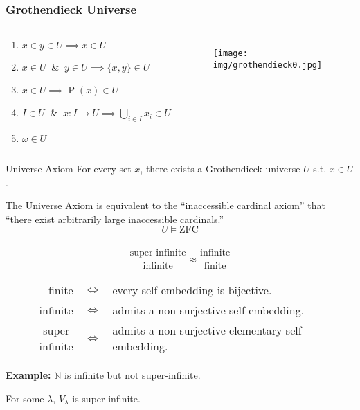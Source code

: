 \documentclass[UTF8,11pt,colorlinks,compress,openany]{beamer}%
\begin{document}
\begin{frame}\frametitle{Grothendieck Universe}
\begin{columns}
\begin{definition}
\begin{enumerate}
\item $x\in y\in U\implies x\in U$
\item $x\in U\;\; \&\;\; y\in U\implies \{x,y\}\in U$
\item $x\in U\implies \operatorname{P}(x)\in U$
\item $I\in U\;\; \&\;\; x: I\to U\implies\bigcup\limits_{i\in I}x_i\in U$
\item $\omega\in U$
\end{enumerate}
\end{definition}
\begin{figure}
\texttt{[image: img/grothendieck0.jpg]}
\end{figure}
\end{columns}
\begin{block}{Universe Axiom}
For every set $x$, there exists a Grothendieck universe $U$ s.t. $x\in U$.
\end{block}
\begin{center}
\end{center}
The Universe Axiom is equivalent to the ``inaccessible cardinal axiom'' that ``there exist arbitrarily large inaccessible cardinals.''
\[U\vDash\mathrm{ZFC}\]
\end{frame}

\begin{frame}\frametitle{}
\[\dfrac{\text{super-infinite}}{\text{infinite}} \approx \dfrac{\text{infinite}}{\text{finite}}\]
\begin{tabu}{rcl}
finite &$\iff$ &every self-embedding is bijective.\\
infinite &$\iff$ &admits a non-surjective self-embedding.\\
super-infinite &$\iff$ &admits a non-surjective elementary self-embedding.
\end{tabu}
\textbf{Example:} $\mathbb{N}$ is infinite but not super-infinite.
\begin{axiom}[Axiom I3]
For some $\lambda$, $V_\lambda$ is super-infinite.
\end{axiom}
\end{frame}
\end{document}
